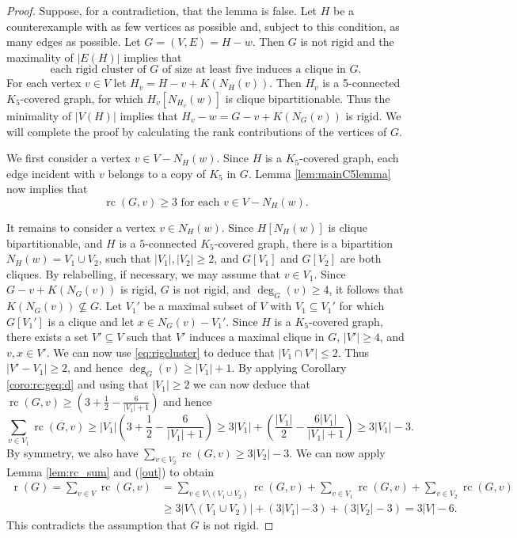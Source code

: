 \documentclass[10pt,a4paper]{amsart}
\DeclareMathOperator{\rc}{rc}
\DeclareMathOperator{\rr}{r}
\begin{document}
\begin{proof}
    Suppose, for a contradiction, that the lemma is false. Let $H$ be a counterexample with as few vertices as possible and, subject to this condition, as many edges as possible.
    Let $G=(V,E)=H-w$. Then $G$ is not rigid and
    the maximality of $|E(H)|$ implies that
    \begin{equation}\label{eq:rigcluster}
        \mbox{each rigid cluster of $G$ of size at least five induces a clique in $G$.}
    \end{equation}
    For each vertex $v\in V$ let $H_v=H-v+K(N_{H}(v))$. Then $H_v$ is a 5-connected $K_5$-covered graph, for which $H_v[N_{H_v}(w)]$ is clique bipartitionable.
    Thus the minimality  of $|V(H)|$ implies that  $H_v-w=G-v+K(N_G(v))$ is rigid.  
    We will complete the proof by calculating the rank contributions of the vertices of $G$.
    
    We first consider a vertex $v\in V-N_{H}(w)$.
    Since $H$ is a $K_5$-covered graph, 
    each edge incident with $v$ belongs to a copy of $K_5$ in $G$.
    Lemma \ref{lem:mainC5lemma} now implies that 
    \begin{equation}
        \label{out}
        \mbox{$\rc(G,v)\geq 3$   for each $v\in V-N_{H}(w)$.}
    \end{equation}
    
It remains to consider a vertex  $v\in N_H(w)$. 
    Since $H[N_{H}(w)]$
    is clique bipartitionable, and $H$ is a $5$-connected $K_5$-covered graph,
    there is a bipartition 
    $N_H(w)=V_1\cup V_2$, such that $|V_1|,|V_2|\geq 2$,
    and $G[V_1]$ and $G[V_2]$ are both cliques.
    By relabelling, if necessary, we may assume that $v\in V_1$.
    Since $G-v+K(N_G(v))$ is rigid, $G$ is not rigid, and $\deg_G(v)\geq 4$,
    it follows that
    $K(N_G(v))\not\subseteq G$. 
    Let $V_1'$ be a maximal subset of $V$ with $V_1\subseteq V_1'$ for which
    $G[V_1']$ is a clique and let $x\in N_G(v)-V_1'$.
    Since $H$ is a $K_5$-covered graph, 
    there exists a set $V'\subseteq V$ such that $V'$ induces a maximal clique in $G$,  $|V'|\geq 4$, and  $v,x\in V'$.
    We can now use \eqref{eq:rigcluster} to deduce that $|V_1\cap V'|\leq 2$.
    Thus $|V'-V_1|\geq 2$, and hence 
    $\deg_G(v)\geq |V_1|+1$. 
By applying
    Corollary \ref{coro:rc:geq:d}
    and using that $|V_1|\geq 2$ we can now deduce that
$\rc(G,v)\geq \left(3+\frac{1}{2}-\frac{6}{|V_1|+1}\right)$ and hence
$$\sum_{v\in V_1}\rc(G,v)\geq |V_1|\left(3+\frac{1}{2}-\frac{6}{|V_1|+1}\right)\geq 3|V_1|+\left(\frac{|V_1|}{2}-\frac{6|V_1|}{|V_1|+1}\right) \geq 3|V_1|-3.$$
    By symmetry, we also have $\sum_{v\in V_2}\rc(G,v)\geq 3|V_2|-3.$
    We can now apply Lemma \ref{lem:rc_sum} and (\ref{out}) to obtain
    \begin{align*}
        \rr(G)=\sum _{v\in V}\rc(G,v)&= \sum_{v\in V\setminus (V_1\cup V_2)}\rc(G,v)+\sum_{v\in V_1}\rc(G,v)+\sum_{v\in V_2}\rc(G,v)\\
        &\geq  3|V\setminus (V_1\cup V_2)| + \left(3|V_1|-3\right)+\left(3|V_2|-3\right)= 3|V|-6.
    \end{align*}
    This contradicts the assumption that $G$ is not rigid.
\end{proof}
\end{document}

